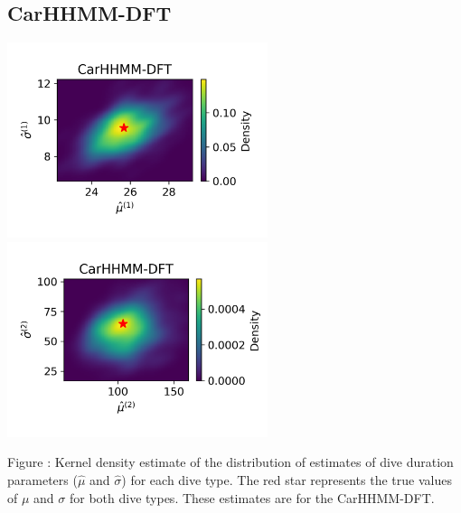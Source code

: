 \documentclass{article}
\begin{document}
        \subsection{CarHHMM-DFT}
        \begin{center}
        \includegraphics[width=3in]{../Plots/hhmm_FV_MLE_density_dive_duration_-1_0.png}
        \includegraphics[width=3in]{../Plots/hhmm_FV_MLE_density_dive_duration_-1_1.png}
        \end{center}
        
        \noindent Figure : Kernel density estimate of the distribution of estimates of dive duration parameters ($\hat \mu$ and $\hat \sigma$) for each dive type. The red star represents the true values of $\mu$ and $\sigma$ for both dive types. These estimates are for the CarHHMM-DFT.
        \addtocounter{fignum}{1}
        
\end{document}
